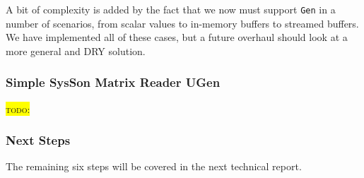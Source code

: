 \documentclass[11pt,a4paper]{article}
\newcommand{\todo}[1]{\colorbox{yellow}{\textsc{todo}: #1}}
\begin{document}
A bit of complexity is added by the fact that we now must support \Verb!Gen! in a number of scenarios, from scalar values to in-memory buffers to streamed buffers. We have implemented all of these cases, but a future overhaul should look at a more general and DRY solution.

\subsubsection{Simple SysSon Matrix Reader UGen}

\todo{}

\subsubsection{Next Steps}

The remaining six steps will be covered in the next technical report.

%
%
%
%
%

\end{document}
